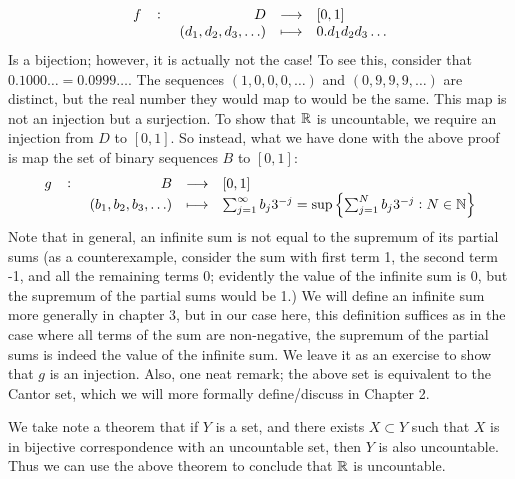 \begin{align*}
    \fullfunction{f}{D}{[0, 1]}{(d_1, d_2, d_3, \ldots)}{0.d_1d_2d_3\ldots}
\end{align*}
Is a bijection; however, it is actually not the case! To see this, consider that $0.1000\ldots = 0.0999\ldots$. The sequences $(1, 0, 0, 0, \ldots)$ and $(0, 9, 9, 9, \ldots)$ are distinct, but the real number they would map to would be the same. This map is not an injection but a surjection. To show that $\mathbb{R}$ is uncountable, we require an injection from $D$ to $[0, 1]$. So instead, what we have done with the above proof is map the set of binary sequences $B$ to $[0, 1]$:
\begin{align*}
    \fullfunction{g}{B}{[0, 1]}{(b_1, b_2, b_3, \ldots)}{\sum_{j=1}^\infty b_j 3^{-j} = \sup\set{\sum_{j=1}^N b_j3^{-j}: N \in \NN}}
\end{align*}
Note that in general, an infinite sum is not equal to the supremum of its partial sums (as a counterexample, consider the sum with first term 1, the second term -1, and all the remaining terms 0; evidently the value of the infinite sum is 0, but the supremum of the partial sums would be 1.) We will define an infinite sum more generally in chapter 3, but in our case here, this definition suffices as in the case where all terms of the sum are non-negative, the supremum of the partial sums is indeed the value of the infinite sum. We leave it as an exercise to show that $g$ is an injection. Also, one neat remark; the above set is equivalent to the Cantor set, which we will more formally define/discuss in Chapter 2. 

We take note a theorem that if $Y$ is a set, and there exists $X \subset Y$ such that $X$ is in bijective correspondence with an uncountable set, then $Y$ is also uncountable. Thus we can use the above theorem to conclude that $\mathbb{R}$ is uncountable.


